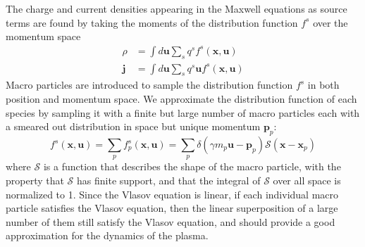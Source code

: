 The charge and current densities appearing in the Maxwell equations as source
terms are found by taking the moments of the distribution function $f^s$ over
the momentum space
\begin{align}
  \rho &= \int d \mathbf{u} \sum_s q^s f^s(\mathbf{x}, \mathbf{u}) \label{eqn:pic-rho} \\
  \mathbf{j} &= \int d \mathbf{u} \sum_s q^s \mathbf{u} f^s(\mathbf{x}, \mathbf{u}) \label{eqn:pic-j}
\end{align}
Macro particles are introduced to sample the distribution function $f^s$ in both
position and momentum space. We approximate the distribution function of each
species by sampling it with a finite but large number of macro particles each
with a smeared out distribution in space but unique momentum $\mathbf{p}_{p}$:
\begin{equation}
  \label{eq:single-particle}
  f^s(\mathbf{x}, \mathbf{u}) = \sum_{p}f^s_{p}(\mathbf{x}, \mathbf{u}) = \sum_{p}\delta(\gamma m_{p}\mathbf{u} - \mathbf{p}_{p}) \mathcal{S}(\mathbf{x} - \mathbf{x}_{p})
\end{equation}
where $\mathcal{S}$ is a function that describes the shape of the macro particle, with the
property that $\mathcal{S}$ has finite support, and that the integral of $\mathcal{S}$ over all
space is normalized to 1. Since the Vlasov equation is linear, if each
individual macro particle satisfies the Vlasov equation, then the linear
superposition of a large number of them still satisfy the Vlasov equation, and
should provide a good approximation for the dynamics of the plasma.

